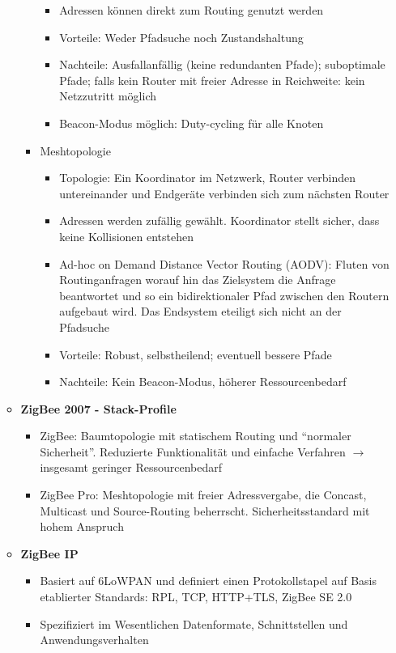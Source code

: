 \begin{itemize}
\begin{itemize}
\begin{itemize}
\begin{itemize}
				\item Adressen können direkt zum Routing genutzt werden
				\item Vorteile: Weder Pfadsuche noch Zustandshaltung
				\item Nachteile: Ausfallanfällig (keine redundanten Pfade); suboptimale Pfade; falls kein Router mit freier Adresse in Reichweite: kein Netzzutritt möglich
				\item Beacon-Modus möglich: Duty-cycling für alle Knoten
			\end{itemize}
			\item Meshtopologie
			\begin{itemize}
				\item Topologie: Ein Koordinator im Netzwerk, Router verbinden untereinander und Endgeräte verbinden sich zum nächsten Router
				\item Adressen werden zufällig gewählt. Koordinator stellt sicher, dass keine Kollisionen entstehen
				\item Ad-hoc on Demand Distance Vector Routing (AODV): Fluten von Routinganfragen worauf hin das Zielsystem die Anfrage beantwortet und so ein bidirektionaler Pfad zwischen den Routern aufgebaut wird. Das Endsystem eteiligt sich nicht an der Pfadsuche
				\item Vorteile: Robust, selbstheilend; eventuell bessere Pfade
				\item Nachteile: Kein Beacon-Modus, höherer Ressourcenbedarf
			\end{itemize}
		\end{itemize}
		\item \textbf{ZigBee 2007 - Stack-Profile}
		\begin{itemize}
			\item ZigBee: Baumtopologie mit statischem Routing und "`normaler Sicherheit"'. Reduzierte Funktionalität und einfache Verfahren \(\rightarrow\) insgesamt geringer Ressourcenbedarf
			\item ZigBee Pro: Meshtopologie mit freier Adressvergabe, die Concast, Multicast und Source-Routing beherrscht. Sicherheitsstandard mit hohem Anspruch
		\end{itemize}
		\item \textbf{ZigBee IP}
		\begin{itemize}
			\item Basiert auf 6LoWPAN und definiert einen Protokollstapel auf Basis etablierter Standards: RPL, TCP, HTTP+TLS, ZigBee SE 2.0
			\item Spezifiziert im Wesentlichen Datenformate, Schnittstellen und Anwendungsverhalten

\end{itemize}
\end{itemize}
\end{itemize}
